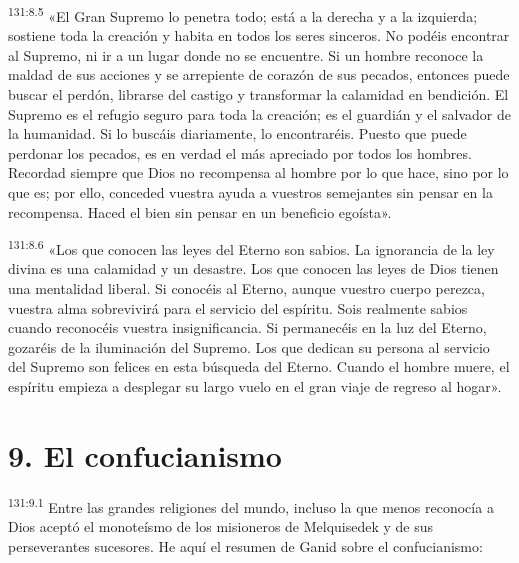 \par
\textsuperscript{131:8.5} «El Gran Supremo lo penetra todo; está a la derecha y a la izquierda; sostiene toda la creación y habita en todos los seres sinceros. No podéis encontrar al Supremo, ni ir a un lugar donde no se encuentre. Si un hombre reconoce la maldad de sus acciones y se arrepiente de corazón de sus pecados, entonces puede buscar el perdón, librarse del castigo y transformar la calamidad en bendición. El Supremo es el refugio seguro para toda la creación; es el guardián y el salvador de la humanidad. Si lo buscáis diariamente, lo encontraréis. Puesto que puede perdonar los pecados, es en verdad el más apreciado por todos los hombres. Recordad siempre que Dios no recompensa al hombre por lo que hace, sino por lo que es; por ello, conceded vuestra ayuda a vuestros semejantes sin pensar en la recompensa. Haced el bien sin pensar en un beneficio egoísta».

\par
\textsuperscript{131:8.6} «Los que conocen las leyes del Eterno son sabios. La ignorancia de la ley divina es una calamidad y un desastre. Los que conocen las leyes de Dios tienen una mentalidad liberal. Si conocéis al Eterno, aunque vuestro cuerpo perezca, vuestra alma sobrevivirá para el servicio del espíritu. Sois realmente sabios cuando reconocéis vuestra insignificancia. Si permanecéis en la luz del Eterno, gozaréis de la iluminación del Supremo. Los que dedican su persona al servicio del Supremo son felices en esta búsqueda del Eterno. Cuando el hombre muere, el espíritu empieza a desplegar su largo vuelo en el gran viaje de regreso al hogar».

\section*{9. El confucianismo}
\par
\textsuperscript{131:9.1} Entre las grandes religiones del mundo, incluso la que menos reconocía a Dios aceptó el monoteísmo de los misioneros de Melquisedek y de sus perseverantes sucesores. He aquí el resumen de Ganid sobre el confucianismo:

